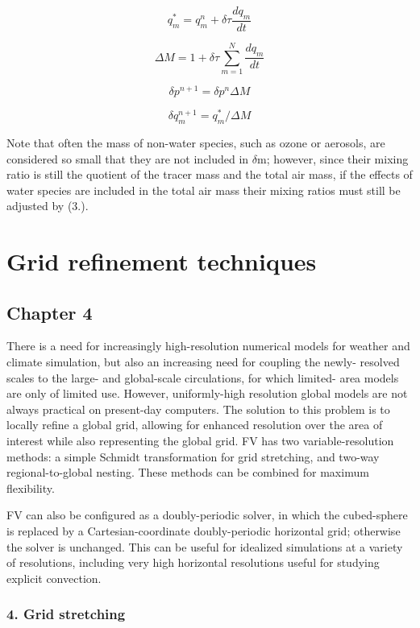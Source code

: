 \[ q^{*}_m = q^n_m + \delta \tau \frac{dq_m}{dt} \tag {3.6} \]

\[ \Delta M = 1 + \delta \tau \sum_{m=1}^N \frac{dq_m}{dt} \tag {3.7} \]

\[ \delta p^{n+1} = \delta p^{n} \Delta M \tag {3.8} \]

\[ \delta q^{n+1}_m = q^{*}_m / \Delta M \tag {3.9} \]

Note that often the mass of non-\/water species, such as ozone or aerosols, are considered so small that they are not included in {$\delta$}m; however, since their mixing ratio is still the quotient of the tracer mass and the total air mass, if the effects of water species are included in the total air mass their mixing ratios must still be adjusted by (3.). \hypertarget{grid}{}\section{Grid refinement techniques}\label{grid}
\subsection*{Chapter 4}

There is a need for increasingly high-\/resolution numerical models for weather and climate simulation, but also an increasing need for coupling the newly-\/ resolved scales to the large-\/ and global-\/scale circulations, for which limited-\/ area models are only of limited use. However, uniformly-\/high resolution global models are not always practical on present-\/day computers. The solution to this problem is to locally refine a global grid, allowing for enhanced resolution over the area of interest while also representing the global grid. F\-V has two variable-\/resolution methods\-: a simple Schmidt transformation for grid stretching, and two-\/way regional-\/to-\/global nesting. These methods can be combined for maximum flexibility.

F\-V can also be configured as a doubly-\/periodic solver, in which the cubed-\/sphere is replaced by a Cartesian-\/coordinate doubly-\/periodic horizontal grid; otherwise the solver is unchanged. This can be useful for idealized simulations at a variety of resolutions, including very high horizontal resolutions useful for studying explicit convection.

\subsubsection*{4. Grid stretching}

